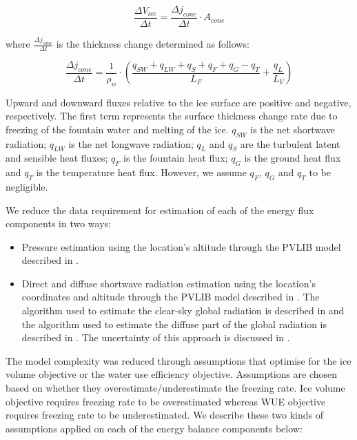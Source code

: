 \documentclass[tc, manuscript]{copernicus}
\begin{document}
\begin{equation}
  \frac{\Delta V_{ice}}{\Delta t}  =  \frac{\Delta j_{cone}}{ \Delta t} \cdot A_{cone}
	\label{eqn:freeze}
\end{equation}

where $\frac{\Delta j_{cone}}{\Delta t}$ is the thickness change determined as follows:

\begin{equation}
  \frac{\Delta j_{cone}}{\Delta t}  = \frac{1}{\rho_w} \cdot (\frac{q_{SW} + q_{LW} + q_{S} + q_{F} + q_{G} -
  q_{T}}{L_F} + \frac{q_{L}}{L_V} )
	\label{eqn:freeze}
\end{equation}

Upward and downward fluxes relative to the ice surface are positive and negative, respectively. The first term
represents the surface thickness change rate due to freezing of the fountain water and melting of the ice.
$q_{SW}$ is the net shortwave radiation; $q_{LW}$ is the net longwave radiation; $q_{L}$ and $q_{S}$ are the
turbulent latent and sensible heat fluxes; $q_{F}$ is the fountain heat flux; $q_{G}$ is the ground heat flux
and $q_{T}$ is the temperature heat flux. However, we assume $q_{F}$, $q_{G}$ and $q_{T}$ to be negligible.

We reduce the data requirement for estimation of each of the energy flux components in two ways:

\begin{itemize}
  \item Pressure estimation using the location's altitude through the PVLIB model described in
    \citet{holmgrenPvlibPythonPython2018}.
  \item Direct and diffuse shortwave radiation estimation using the location's coordinates and altitude through the
    PVLIB model described in \citet{holmgrenPvlibPythonPython2018}. The algorithm used to estimate the
    clear-sky global radiation is described in \citet{ineichenBroadbandSimplifiedVersion2008} and the algorithm
    used to estimate the diffuse part of the global radiation is described in
\citet{erbsEstimationDiffuseRadiation1982}. The uncertainty of this approach is discussed in
\cite{ineichenValidationModelsThat2016}. 
\end{itemize}

The model complexity was reduced through assumptions that optimise for the ice volume objective or the water use
efficiency objective. Assumptions are chosen based on whether they overestimate/underestimate the freezing rate.
Ice volume objective requires freezing rate to be overestimated whereas WUE objective requires freezing rate to
be underestimated. We describe these two kinds of assumptions applied on each of the energy balance components
below: 
\end{document}
